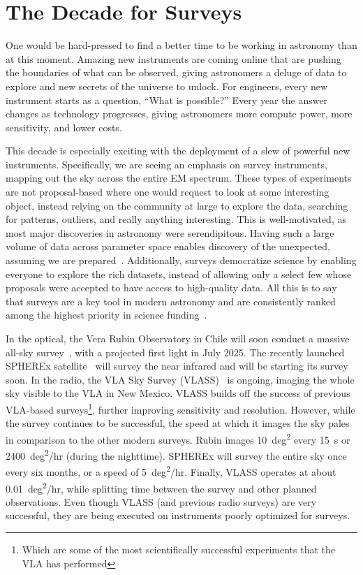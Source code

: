 \section{The Decade for Surveys}

One would be hard-pressed to find a better time to be working in astronomy than at this moment.
Amazing new instruments are coming online that are pushing the boundaries of what can be observed, giving astronomers a deluge of data to explore and new secrets of the universe to unlock.
For engineers, every new instrument starts as a question, “What is possible?”
Every year the answer changes as technology progresses, giving astronomers more compute power, more sensitivity, and lower costs.

This decade is especially exciting with the deployment of a slew of powerful new instruments.
Specifically, we are seeing an emphasis on survey instruments, mapping out the sky across the entire EM spectrum.
These types of experiments are not proposal-based where one would request to look at some interesting object, instead relying on the community at large to explore the data, searching for patterns, outliers, and really anything interesting.
This is well-motivated, as most major discoveries in astronomy were serendipitous.
Having such a large volume of data across parameter space enables discovery of the unexpected, assuming we are prepared~\cite{norrisDiscoveringUnexpectedAstronomical2017}.
Additionally, surveys democratize science by enabling everyone to explore the rich datasets, instead of allowing only a select few whose proposals were accepted to have access to high-quality data.
All this is to say that surveys are a key tool in modern astronomy and are consistently ranked among the highest priority in science funding~\cite{nationalacademiesofsciencesPathwaysDiscoveryAstronomy2023}.

In the optical, the Vera Rubin Observatory in Chile will soon conduct a massive all-sky survey~\cite{biancoOptimizationObservingCadence2021}, with a projected first light in July 2025.
The recently launched SPHEREx satellite~\cite{crillSPHERExNASAsNearinfrared2020} will survey the near infrared and will be starting its survey soon.
In the radio, the VLA Sky Survey (VLASS)~\cite{lacyKarlJanskyVery2020} is ongoing, imaging the whole sky visible to the VLA in New Mexico.
VLASS builds off the success of previous VLA-based surveys\footnote{Which are some of the most scientifically successful experiments that the VLA has performed}, further improving sensitivity and resolution.
However, while the survey continues to be successful, the speed at which it images the sky pales in comparison to the other modern surveys.
Rubin images \qty{10}{deg^2} every \qty{15}{\s} or \qty{2400}{deg^2/hr} (during the nighttime).
SPHEREx will survey the entire sky once every six months, or a speed of \qty{5}{deg^2/hr}.
Finally, VLASS operates at about \qty{0.01}{deg^2/hr}, while splitting time between the survey and other planned observations.
Even though VLASS (and previous radio surveys) are very successful, they are being executed on instruments poorly optimized for surveys.

